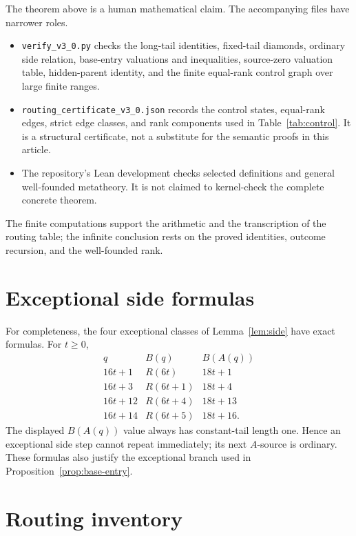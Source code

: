 \documentclass[11pt]{article}
\begin{document}
The theorem above is a human mathematical claim. The accompanying files have
narrower roles.
\begin{itemize}[leftmargin=*]
\item \texttt{verify\_v3\_0.py} checks the long-tail identities, fixed-tail
      diamonds, ordinary side relation, base-entry valuations and inequalities,
      source-zero valuation table, hidden-parent identity, and the finite
      equal-rank control graph over large finite ranges.
\item \texttt{routing\_certificate\_v3\_0.json} records the control states,
      equal-rank edges, strict edge classes, and rank components used in
      Table~\ref{tab:control}. It is a structural certificate, not a substitute
      for the semantic proofs in this article.
\item The repository's Lean development checks selected definitions and
      general well-founded metatheory. It is not claimed to kernel-check the
      complete concrete theorem.
\end{itemize}

The finite computations support the arithmetic and the transcription of the
routing table; the infinite conclusion rests on the proved identities,
outcome recursion, and the well-founded rank.

\appendix
\section{Exceptional side formulas}\label{app:exceptional}

For completeness, the four exceptional classes of Lemma~\ref{lem:side} have
exact formulas. For $t\ge0$,
\[
\begin{array}{c|c|c}
q&B(q)&B(A(q))\\ \hline
16t+1  &R(6t)   &18t+1\\
16t+3  &R(6t+1) &18t+4\\
16t+12 &R(6t+4) &18t+13\\
16t+14 &R(6t+5) &18t+16.
\end{array}
\]
The displayed $B(A(q))$ value always has constant-tail length one. Hence an
exceptional side step cannot repeat immediately; its next $A$-source is
ordinary. These formulas also justify the exceptional branch used in
Proposition~\ref{prop:base-entry}.

\section{Routing inventory}\label{app:routing}
\end{document}
